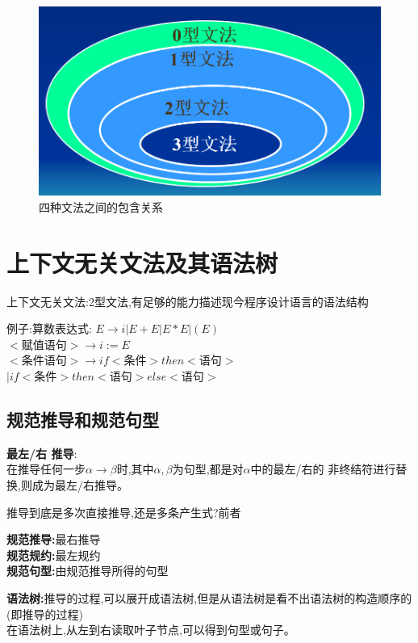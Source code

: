 \begin{figure}[H]
 \centering
 \includegraphics[scale = 0.3]{assets/CompilerConstructionPrinciples-part1_f8a53.png}
 \caption{四种文法之间的包含关系}
\end{figure}

\section{上下文无关文法及其语法树}
上下文无关文法:2型文法,有足够的能力描述现今程序设计语言的语法结构

例子:算数表达式:
$E\to i|E+E|E*E|(E)$\\
$<\text{赋值语句}> \to i := E$\\
$<\text{条件语句}> \to if <\text{条件}> then <\text{语句}>$\\
\makebox[2cm]{}$| if <\text{条件}> then <\text{语句}> else <\text{语句}>$

\subsection{规范推导和规范句型}
\textbf{最左/右 推导}:\\
在推导任何一步$\alpha\to \beta$时,其中$\alpha,\beta$为句型,都是对$\alpha$中的最左/右的
非终结符进行替换,则成为最左/右推导。

{\color{blue}推导到底是多次直接推导,还是多条产生式?前者}

\textbf{规范推导:}最右推导\\
\textbf{规范规约:}最左规约\\
\textbf{规范句型:}由规范推导所得的句型

\textbf{语法树:}推导的过程,可以展开成语法树,但是从语法树是看不出语法树的构造顺序的(即推导的过程)\\
在语法树上,从左到右读取叶子节点,可以得到句型或句子。

